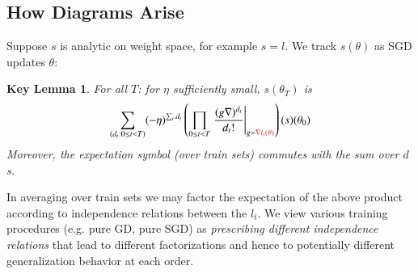 \documentclass{article}
\newtheorem*{klem*}{Key Lemma}
\begin{document}
    \subsection{How Diagrams Arise}
        Suppose $s$ is analytic on weight space, for example $s=l$.
        We track $s(\theta)$ as SGD updates $\theta$: %
        \begin{klem*} %
            For all $T$: for $\eta$ sufficiently small, $s(\theta_T)$ is
            \begin{equation}\label{eq:dyson}
                \sum_{(d_t: 0\leq t<T)}
                (-\eta)^{\sum_t d_t}
                \left(
                    \prod_{0 \leq t < T}
                        \left.
                            \frac{(g \nabla)^{d_t}}{d_t!}
                        \right|_{g={\color{moor}\nabla l_t(\theta)}}
                \right)
                (s) (\theta_0)
            \end{equation}
            Moreover, the expectation symbol (over train sets) commutes with
            the sum over $d$s.
        \end{klem*}
        In averaging over train sets we may factor the expectation of the above
        product according to independence relations between the $l_t$.  We view
        various training procedures (e.g. pure GD, pure SGD) as
        \emph{prescribing different independence relations} that lead to
        different factorizations and hence to potentially different
        generalization behavior at each order.
    
\end{document}
